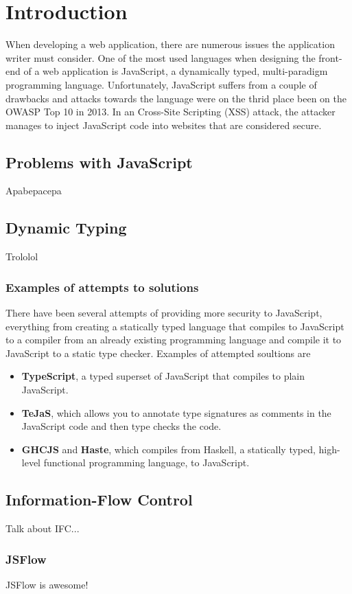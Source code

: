 \section{Introduction}
When developing a web application, there are numerous issues the application writer must consider. One of the most used languages when designing the front-end of a web application is JavaScript, a dynamically typed, multi-paradigm programming language. Unfortunately, JavaScript suffers from a couple of drawbacks and attacks towards the language were on the thrid place been on the OWASP Top 10 in 2013.\cite{owasp_xss_rank} In an Cross-Site Scripting (XSS) attack, the attacker manages to inject JavaScript code into websites that are considered secure.\cite{owasp_xss, excess_xss} 

\subsection{Problems with JavaScript}
Apabepacepa
\subsection{Dynamic Typing}
Trololol
\subsubsection{Examples of attempts to solutions}
There have been several attempts of providing more security to JavaScript, everything from creating a statically typed language that compiles to JavaScript to a compiler from an already existing programming language and compile it to JavaScript to a static type checker. Examples of attempted soultions are
\begin{itemize}
  \item \textbf{TypeScript}\cite{typescript}, a typed superset of JavaScript that compiles to plain JavaScript.
  \item \textbf{TeJaS}\cite{tejas-art,tejas-git}, which allows you to annotate type signatures as comments in the JavaScript code and then type checks the code.
  \item \textbf{GHCJS}\cite{ghcjs} and \textbf{Haste}\cite{haste-lang,haste-symposium}, which compiles from Haskell, a statically typed, high-level functional programming language\cite{haskell}, to JavaScript.
\end{itemize}

\subsection{Information-Flow Control}
Talk about IFC...
\subsubsection{JSFlow}
JSFlow is awesome!
